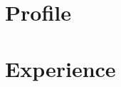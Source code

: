 \documentclass{article}
\begin{document}
	\noindent
	\begin{minipage}[t]{0.7\textwidth}
		\vspace{-20pt} %
		\section*{\textcolor{colorBlue}{Profile}}
		
			\section*{\textcolor{colorBlue}{Experience}}
		
		\vspace{10pt} %
		
	\end{minipage}%
	\hfill
\end{document}
